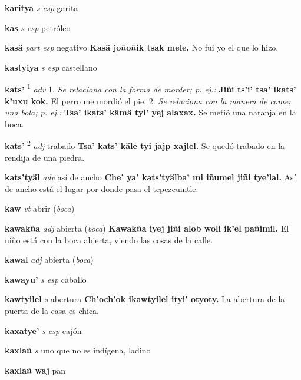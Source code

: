 \documentclass[10pt]{scrbook}
\newcommand{\entry}[1]{\textbf{#1}}
\newcommand{\onedefinition}[1]{#1.}
\newcommand{\defsuperscript}[1]{\textsuperscript{#1}}
\newcommand{\nontranslationdef}[1]{\textit{#1}}
\newcommand{\partofspeech}[1]{\textit{#1}}
\newcommand{\spanishtranslation}[1]{#1}
\newcommand{\clarification}[1]{(\textit{#1})}
\newcommand{\cholexample}[1]{\textbf{#1}}
\newcommand{\exampletranslation}[1]{#1}
\begin{document}
\begin{multicols}{2}
\entry{karitya}
\partofspeech{s esp}
\spanishtranslation{garita}

\entry{kas}
\partofspeech{s esp}
\spanishtranslation{petróleo}

\entry{kasä}
\partofspeech{part esp}
\spanishtranslation{negativo}
\cholexample{Kasä joñoñik tsak mele.}
\exampletranslation{No fui yo el que lo hizo.}

\entry{kastyiya}
\partofspeech{s esp}
\spanishtranslation{castellano}

\entry{kats'}
\defsuperscript{1}
\partofspeech{adv}
\onedefinition{1}
\nontranslationdef{Se relaciona con la forma de morder; p. ej.:}
\cholexample{Jiñi ts'i' tsa' ikats' k'uxu kok.}
\exampletranslation{El perro me mordió el pie.}
\onedefinition{2}
\nontranslationdef{Se relaciona con la manera de comer una bola; p. ej.:}
\cholexample{Tsa' ikats' kämä tyi' yej alaxax.}
\exampletranslation{Se metió una naranja en la boca.}

\entry{kats'}
\defsuperscript{2}
\partofspeech{adj}
\spanishtranslation{trabado}
\cholexample{Tsa' kats' käle tyi jajp xajlel.}
\exampletranslation{Se quedó trabado en la rendija de una piedra.}

\entry{kats'tyäl}
\partofspeech{adv}
\spanishtranslation{así de ancho}
\cholexample{Che' ya' kats'tyälba' mi iñumel jiñi tye'lal.}
\exampletranslation{Así de ancho está el lugar por donde pasa el tepezcuintle.}

\entry{kaw}
\partofspeech{vt}
\spanishtranslation{abrir}
\clarification{boca}

\entry{kawakña}
\partofspeech{adj}
\spanishtranslation{abierta}
\clarification{boca}
\cholexample{Kawakña iyej jiñi alob woli ik'el pañimil.}
\exampletranslation{El niño está con la boca abierta, viendo las cosas de la calle.}

\entry{kawal}
\partofspeech{adj}
\spanishtranslation{abierta}
\clarification{boca}

\entry{kawayu'}
\partofspeech{s esp}
\spanishtranslation{caballo}

\entry{kawtyilel}
\partofspeech{s}
\spanishtranslation{abertura}
\cholexample{Ch'och'ok ikawtyilel ityi' otyoty.}
\exampletranslation{La abertura de la puerta de la casa es chica.}

\entry{kaxatye'}
\partofspeech{s esp}
\spanishtranslation{cajón}

\entry{kaxlañ}
\partofspeech{s}
\spanishtranslation{uno que no es indígena, ladino}

\entry{kaxlañ waj}
\spanishtranslation{pan}


\end{multicols}
\end{document}
